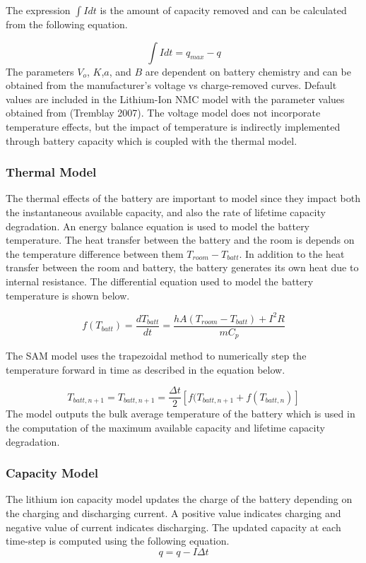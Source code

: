 The expression $\int{Idt}$ is the amount of capacity removed and can be calculated from the following equation.

\begin{equation}
\int{Idt} = q_{max} - {q}
\label{Equation: charge_removed}
\end{equation}
The parameters $V_o$, $K$,$a$, and $B$ are dependent on battery chemistry and can be obtained from the manufacturer's voltage vs charge-removed curves. Default values are included in the Lithium-Ion NMC model with the parameter values obtained from   (Tremblay 2007). The voltage model does not incorporate temperature effects, but the impact of temperature is indirectly implemented through battery capacity which is coupled with the thermal model.

\subsubsection{Thermal Model}
The thermal effects of the battery are important to model since they impact both the instantaneous available capacity, and also the rate of lifetime capacity degradation. An energy balance equation is used to model the battery temperature. The heat transfer between the battery and the room is depends on the temperature difference between them $T_{room}-T_{batt}$. In addition to the heat transfer between the room and battery, the battery generates its own heat due to internal resistance. The differential equation used to model the battery temperature is shown below.

\begin{equation}
f(T_{batt}) = \frac{dT_{batt}}{dt}= \frac{hA(T_{room} - T_{batt}) + I^2R}{mC_p}
\label{Equation: battery_temp_nmc}
\end{equation}

The SAM model uses the trapezoidal method to numerically step the temperature forward in time as described in the equation below.

\begin{equation}
T_{batt,n+1} = T_{batt,n+1} = \frac{\Delta t}{2}\left[f(T_{batt,n+1} + f(T_{batt,n})\right]
\label{Equation: batt_temp_trapezoidal}
\end{equation}
The model outputs the bulk average temperature of the battery which is used in the computation of the maximum available capacity and lifetime capacity degradation.

\subsubsection{Capacity Model}
The lithium ion capacity model updates the charge of the battery depending on the charging and discharging current. A positive value indicates charging and negative value of current indicates discharging. The updated capacity at each time-step is computed using the following equation.
\begin{equation}
q = q - I\Delta {t}
\label{Equation: capacity_update_nmc}
\end{equation}

